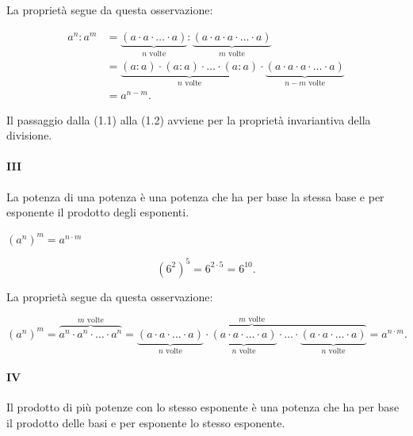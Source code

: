 La proprietà segue da questa osservazione:
\begin{inaccessibleblock}
\begin{align}
 a^n: a^m &= \underbrace{(a\cdot a\cdot\ldots\cdot a)}_{n\text{ volte}}:%
 \underbrace{(a\cdot a\cdot a\cdot\ldots\cdot a)}_{m\text{ volte}}\\
 &=\underbrace{(a:a)\cdot(a:a)\cdot\ldots\cdot(a:a)}_{n\text{ volte}}\cdot%
 \underbrace{(a\cdot a\cdot a\cdot\ldots\cdot a)}_{n-m\text{ volte}}\\%
 &=a^{n-m}.
\end{align}
\end{inaccessibleblock}

Il passaggio dalla (1.1) alla (1.2) avviene per la proprietà invariantiva 
della divisione.

\paragraph{III} La potenza di una potenza è una potenza che ha per 
base la stessa base e per esponente il prodotto degli esponenti.

\begin{minipage}[t]{.45\textwidth}
\centering
\vspace{4mm}
  \(\boxed{(a^n)^m=a^{n\cdot m}}\)
\end{minipage}\hfil
\begin{minipage}[t]{.45\textwidth}
\centering
\[(6^2)^5=6^{2\cdot 5}=6^{10}. \]
\end{minipage}
\vspace{.5cm}

La proprietà segue da questa osservazione:

\begin{inaccessibleblock}
\[ (a^n)^m =\overbrace{a^n\cdot a^n\cdot\ldots\cdot a^n}^{m\text{ volte}}%
 =\overbrace{\underbrace{(a\cdot a\cdot\ldots\cdot a)}_{n\text{ 
volte}}\cdot%
   \underbrace{(a\cdot a\cdot\ldots\cdot a)}_{n\text{ 
volte}}\cdot\ldots\cdot%
   \underbrace{(a\cdot a\cdot\ldots\cdot a)}_{n\text{ 
volte}}}^{m\text{ volte}}%
   =a^{n\cdot m}.\]
\end{inaccessibleblock}

\paragraph{IV} Il prodotto di più potenze con lo stesso esponente è
una potenza che ha per base il prodotto delle basi e per esponente lo stesso
esponente.

